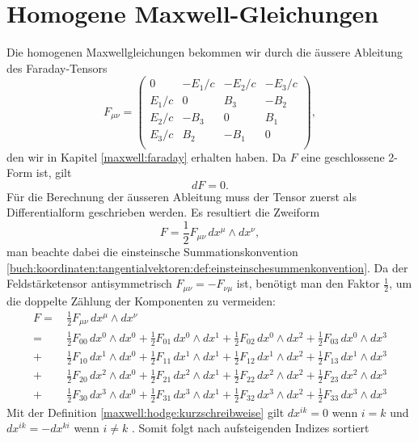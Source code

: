 \section{Homogene Maxwell-Gleichungen}
Die homogenen Maxwellgleichungen bekommen wir durch die äussere Ableitung des Faraday-Tensors 
\[
F_{\mu\nu}
= 
\begin{pmatrix}
	0 & -E_1/c & -E_2/c & -E_3/c \\
	E_1/c &  0 &  B_3 & -B_2 \\
	E_2/c & -B_3 &  0 &  B_1 \\
	E_3/c &  B_2 & -B_1 &  0 \\
\end{pmatrix} ,
\]
den wir in Kapitel \ref{maxwell:faraday} erhalten haben.
Da $F$ eine geschlossene 2-Form ist, gilt
\[
dF = 0 .
\]
Für die Berechnung der äusseren Ableitung muss der Tensor zuerst als Differentialform geschrieben werden.
Es resultiert die Zweiform
\[
F
= \frac{1}{2} F_{\mu\nu} \, dx^\mu \wedge dx^\nu,
\]
man beachte dabei die einsteinsche Summationskonvention \ref{buch:koordinaten:tangentialvektoren:def:einsteinschesummenkonvention}.
Da der Feldstärketensor antisymmetrisch $F_{\mu\nu} = -F_{\nu\mu}$ ist, benötigt man den Faktor $\frac{1}{2}$, um die doppelte Zählung der Komponenten zu vermeiden:
\begin{align*}
	F
	= \,
	&\frac{1}{2} F_{\mu\nu} \, dx^\mu \wedge dx^\nu
	\\
	= \,
	&\frac{1}{2} F_{00} \, dx^0 \wedge dx^0 + \frac{1}{2} F_{01} \, dx^0 \wedge dx^1 + \frac{1}{2} F_{02} \, dx^0 \wedge dx^2 + \frac{1}{2} F_{03} \, dx^0 \wedge dx^3
	\\
	+ \, &\frac{1}{2} F_{10} \, dx^1 \wedge dx^0 + \frac{1}{2} F_{11} \, dx^1 \wedge dx^1 + \frac{1}{2} F_{12} \, dx^1 \wedge dx^2 + \frac{1}{2} F_{13} \, dx^1 \wedge dx^3
	\\
	+ \, &\frac{1}{2} F_{20} \, dx^2 \wedge dx^0 + \frac{1}{2} F_{21} \, dx^2 \wedge dx^1 + \frac{1}{2} F_{22} \, dx^2 \wedge dx^2 + \frac{1}{2} F_{23} \, dx^2 \wedge dx^3
	\\
	+ \, &\frac{1}{2} F_{30} \, dx^3 \wedge dx^0 + \frac{1}{2} F_{31} \, dx^3 \wedge dx^1 + \frac{1}{2} F_{32} \, dx^3 \wedge dx^2 + \frac{1}{2} F_{33} \, dx^3 \wedge dx^3
\end{align*} 
Mit der Definition \ref{maxwell:hodge:kurzschreibweise} gilt $dx^{ik} = 0$ wenn $i=k$ und $dx^{ik} = -dx^{ki}$ wenn $i \neq k $ . Somit folgt nach aufsteigenden Indizes sortiert
